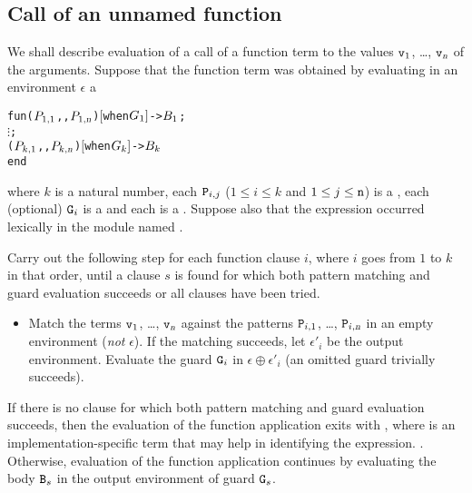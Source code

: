 \subsection{Call of an unnamed function}

\label{section:appl-unnamed-function}

We shall describe evaluation of a call of a function term to the values
${\tt{\sl v}}_1$, \ldots, ${\tt{\sl v}}_{\mbox{\scriptsize\sl{n}}}$ of the arguments.
Suppose that the function term was obtained by evaluating in an environment $\epsilon$ a
\begin{alltt}
fun (\(\Z{P}\sb{1,1}\),\tdots,\(\Z{P}\sb{1,\TZm{n}}\)) \([\)when \(\Z{G}\sb{1}]\) -> \(\Z{B}\sb{1}\) ;
    \(\vdots\) ;
    (\(\Z{P}\sb{k,1}\),\tdots,\(\Z{P}\sb{k,\TZm{n}}\)) \([\)when \(\Z{G}\sb{k}]\) -> \(\Z{B}\sb{k}\)
end
\end{alltt}
where $k$ is a natural number, each ${\tt{\sl P}}_{i,j}$ ($1\leq i\leq k$ and
$1\leq j\leq {\tt{\sl n}}$) is a , each (optional) ${\tt{\sl G}}_i$ is a 
and each  is a .  Suppose also that the  expression
occurred lexically in the module named .

Carry out the following step for each function clause $i$, where $i$ goes from $1$ to $k$ in that order,
until a clause $s$ is found for which both pattern matching and guard evaluation succeeds or all clauses
have been tried.
\begin{itemize}
\item Match the terms ${\tt{\sl v}}_1$, \ldots, ${\tt{\sl v}}_{\mbox{\scriptsize\tt{\sl{n}}}}$
against the patterns ${\tt{\sl P}}_{i,1}$, \ldots, ${\tt{\sl P}}_{i,\mbox{\scriptsize\tt{\sl{n}}}}$ in an empty environment
(\emph{not} $\epsilon$).  If
the matching succeeds, let $\epsilon'_i$ be the output environment.
Evaluate the guard ${\tt{\sl G}}_i$ in $\epsilon\oplus\epsilon'_i$ (an omitted
guard trivially succeeds).
\end{itemize}
If there is no clause for which both pattern matching and guard evaluation succeeds,
then the evaluation of the function application exits with
\ifStd
{},
where  is an implementation-specific term that may help in
identifying the  expression.
\else
{}.
\fi
Otherwise, evaluation of the function application continues by
evaluating the body ${\tt{\sl B}}_s$ in the output environment of guard
${\tt{\sl G}}_s$.

